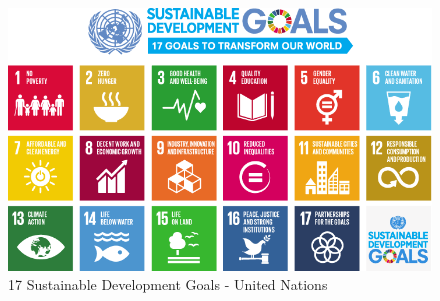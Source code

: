 \begin{figure}[H]
    \centering
    \includegraphics[width=1\textwidth]{pics/SDG-17goals.png}
    \caption{17 Sustainable Development Goals - United Nations}
    \label{fig:SDG17goals}
\end{figure}

